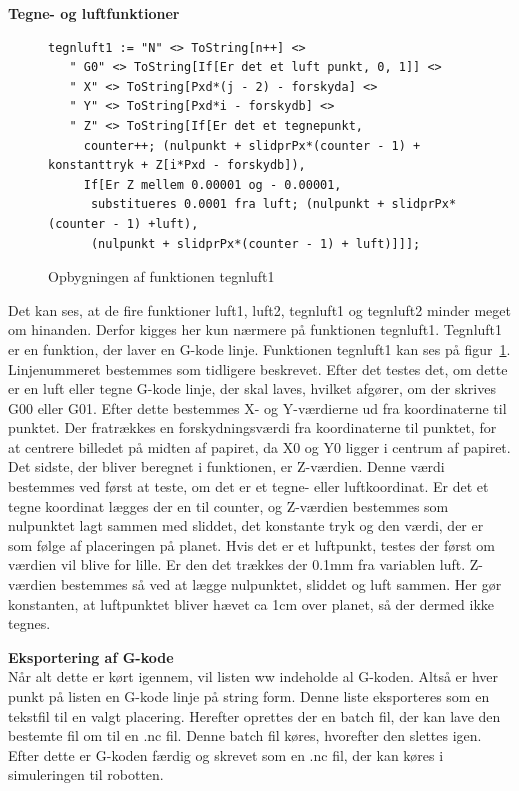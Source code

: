 \textbf{Tegne- og luftfunktioner}\\
\begin{figure}[h]
	\begin{lstlisting}
tegnluft1 := "N" <> ToString[n++] <>
   " G0" <> ToString[If[Er det et luft punkt, 0, 1]] <>
   " X" <> ToString[Pxd*(j - 2) - forskyda] <>
   " Y" <> ToString[Pxd*i - forskydb] <>
   " Z" <> ToString[If[Er det et tegnepunkt, 
     counter++; (nulpunkt + slidprPx*(counter - 1) + konstanttryk + Z[i*Pxd - forskydb]),
     If[Er Z mellem 0.00001 og - 0.00001, 
      substitueres 0.0001 fra luft; (nulpunkt + slidprPx*(counter - 1) +luft),
      (nulpunkt + slidprPx*(counter - 1) + luft)]]];
 \end{lstlisting}
	\caption{Opbygningen af funktionen tegnluft1}
	\label{fig:tegnluft1}
	\end{figure}
Det kan ses, at de fire funktioner luft1, luft2, tegnluft1 og tegnluft2 minder meget om hinanden. Derfor kigges her kun nærmere på funktionen tegnluft1. Tegnluft1 er en funktion, der laver en G-kode linje. Funktionen tegnluft1 kan ses på figur~\ref{fig:tegnluft1}. Linjenummeret bestemmes som tidligere beskrevet. Efter det testes det, om dette er en luft eller tegne G-kode linje, der skal laves, hvilket afgører, om der skrives G00 eller G01. Efter dette bestemmes X- og Y-værdierne ud fra koordinaterne til punktet. Der fratrækkes en forskydningsværdi fra koordinaterne til punktet, for at centrere billedet på midten af papiret, da X0 og Y0 ligger i centrum af papiret. Det sidste, der bliver beregnet i funktionen, er Z-værdien. Denne værdi bestemmes ved først at teste, om det er et tegne- eller luftkoordinat. Er det et tegne koordinat lægges der en til counter, og Z-værdien bestemmes som nulpunktet lagt sammen med sliddet, det konstante tryk og den værdi, der er som følge af placeringen på planet. Hvis det er et luftpunkt, testes der først om værdien vil blive for lille. Er den det trækkes der 0.1mm fra variablen luft. Z-værdien bestemmes så ved at lægge nulpunktet, sliddet og luft sammen. Her gør konstanten, at luftpunktet bliver hævet ca 1cm over planet, så der dermed ikke tegnes.

\textbf{Eksportering af G-kode}\\
Når alt dette er kørt igennem, vil listen ww indeholde al G-koden. Altså er hver punkt på listen en G-kode linje på string form. Denne liste eksporteres som en tekstfil til en valgt placering. Herefter oprettes der en batch fil, der kan lave den bestemte fil om til en .nc fil. Denne batch fil køres, hvorefter den slettes igen. Efter dette er G-koden færdig og skrevet som en .nc fil, der kan køres i simuleringen til robotten.
